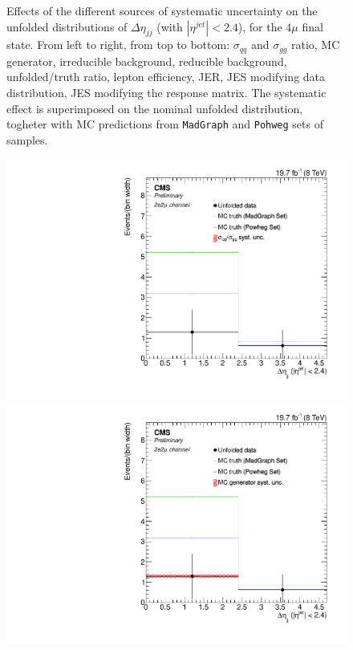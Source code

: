 \begin{figure}[hbtp]
\begin{center}
   \caption{Effects of the different sources of systematic uncertainty on the unfolded distributions of $\Delta\eta_{jj}$ (with $|\eta^{jet}|<2.4$), for the $4\mu$ final state. From left to right, from top to bottom: $\sigma_{qq}$ and $\sigma_{gg}$ ratio, MC generator, irreducible background, reducible background, unfolded/truth ratio, lepton efficiency, JER, JES modifying data distribution, JES modifying the response matrix. The systematic effect is superimposed on the nominal unfolded distribution, togheter with MC predictions from \texttt{MadGraph} and \texttt{Pohweg} sets of samples.}
   \label{fig:CentralDeta_syst_4m}
 \end{center}
\end{figure}

\begin{figure}[hbtp]
 \begin{center}
   \includegraphics[width=0.8\cmsFigWidth]{Figures/Unfolding/Systematics/ZZTo2e2m_CentralDeta_qqgg_Mad_fr}     
   \includegraphics[width=0.8\cmsFigWidth]{Figures/Unfolding/Systematics/ZZTo2e2m_CentralDeta_MCgen_Mad_fr}     

\end{center}
\end{figure}
